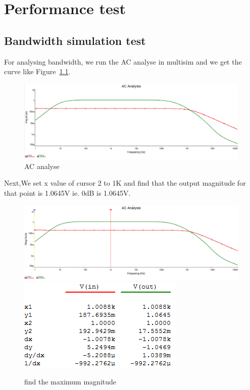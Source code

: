 \chapter{Performance test} 

\section{Bandwidth simulation test} 

For analysing bandwidth, we run the AC analyse in multisim and we get the curve like Figure~\ref{fig:AC analyse}.

\begin{figure}[htbp]
\centering
\includegraphics[scale=0.45]{"../Photo/Chap7/bandewith simulation"}
\caption{AC analyse}
\label{fig:AC analyse}
\end{figure}

Next,We set x value of cursor 2 to 1K and find that the output magnitude for that point is 1.0645V ie. 0dB is 1.0645V.

\begin{figure}[htbp]
\centering
\includegraphics[scale=0.45]{"../Photo/Chap7/1k cursor"}\\[0.5cm]
\includegraphics[scale=1]{"../Photo/Chap7/1k cursor data"}
\caption{find the maximum magnitude}
\label{fig:find the maximum magnitude}
\end{figure}

